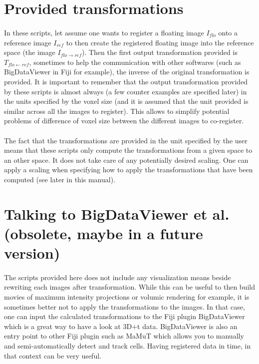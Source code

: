 \documentclass[10pt,a4paper]{book}
\newcommand{\T}[2]{T_{{#1}\leftarrow{#2}}}
\begin{document}
\section{Provided transformations}
\paragraph{}In these scripts, let assume one wants to register a floating image $I_{flo}$ onto a reference image $I_{ref}$ to then create the registered floating image into the reference space (the image $I_{flo\rightarrow ref}$). Then the first output transformation provided is $\T{flo}{ref}$, sometimes to help the communication with other softwares (such as BigDataViewer in Fiji for example), the inverse of the original transformation is provided. It is important to remember that the output transformation provided by these scripts is almost always (a few counter examples are specified later) in the units specified by the voxel size (and it is assumed that the unit provided is similar across all the images to register). This allows to simplify potential problems of difference of voxel size between the different images to co-register.
\paragraph{}The fact that the transformations are provided in the unit specified by the user means that these scripts only compute the transformations from a given space to an other space. It does not take care of any potentially desired scaling. One can apply a scaling when specifying how to apply the transformations that have been computed (see later in this manual).
\section{Talking to BigDataViewer et al. (obsolete, maybe in a future version)}
\paragraph{}The scripts provided here does not include any visualization means beside rewriting each images after transformation. While this can be useful to then build movies of maximum intensity projections or volumic rendering for example, it is sometimes better not to apply the transformations to the images. In that case, one can input the calculated transformations to the Fiji plugin BigDataViewer which is a great way to have a look at 3D+t data. BigDataViewer is also an entry point to other Fiji plugin such as MaMuT which allows you to manually and semi-automatically detect and track cells. Having registered data in time, in that context can be very useful.
\end{document}
